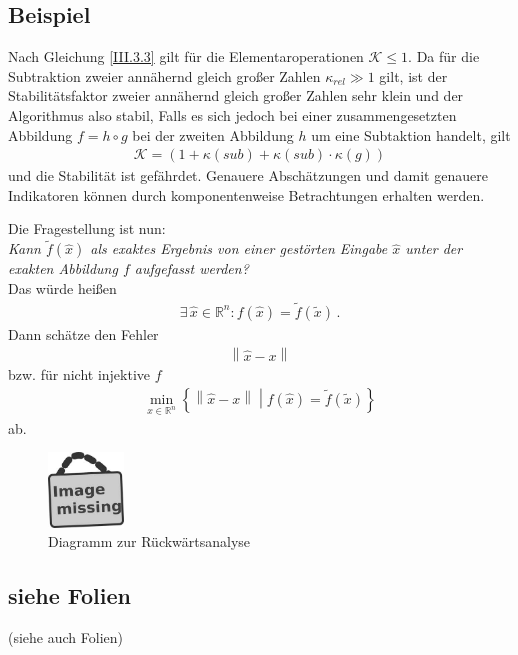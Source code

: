 \documentclass[ngerman,fontsize=11pt, paper=a4, parskip=half, titlepage=true, toc=bib]{scrbook}
\newcommand{\Ren}{\mathds{R}^{n}}
\newcommand{\K}{\mathcal{K}}
\newcommand{\nn}[1]{\left\| #1 \right\|}
\newcommand{\extrasection}[2]{\vspace{1.5eM}\minisec{\Large\itshape \thesection #1 #2}\vspace{1eM}}
\begin{document}
\subsection{Beispiel}
Nach Gleichung \eqref{III.3.3} gilt für die Elementaroperationen $\K\leq 1$.
Da für die Subtraktion zweier annähernd gleich großer Zahlen $\kappa_{rel}\gg 1$ gilt,
ist der Stabilitätsfaktor zweier annähernd gleich großer
Zahlen sehr klein und der Algorithmus also stabil, Falls es sich jedoch bei einer zusammengesetzten Abbildung $f=h\circ g$  bei der zweiten Abbildung $h$ um eine Subtaktion handelt, gilt
\begin{gather*}
	\K =(1+\kappa(sub)+\kappa(sub)\cdot\kappa(g))
\end{gather*}
und die Stabilität ist gefährdet.
Genauere Abschätzungen und damit genauere Indikatoren können durch komponentenweise Betrachtungen erhalten werden.


\extrasection{b)}{Rückwärtsanalyse} 
Die Fragestellung ist nun: \\
\textit{Kann $\widetilde{f}(\widehat{x})$ als exaktes Ergebnis von einer gestörten Eingabe $\widehat{x}$ unter der exakten Abbildung $f$ aufgefasst werden?}\\
Das würde heißen
\begin{gather*}
	\exists\, \widehat{x}\in \Ren: f(\widehat{x})= \widetilde{f}(\widetilde{x}) \, .
\end{gather*}
Dann schätze den Fehler 
\begin{gather*} 
	\nn{\widehat{x}-x}
\end{gather*}
 bzw. für nicht injektive $f$
 \begin{gather*}
	\min_{\widehat{x}\in \Ren}
\left\{
 	\nn{\widehat{x}-x} 
 					\middle\vert f(\widehat{x}) = \widetilde{f}(\widetilde{x}) 
 					\right\}
 \end{gather*} 
  ab. \\
  
  	  \begin{figure}
  	  	\parbox{\linewidth}{
  	  		\centering
  	  		\includegraphics[width=2cm]{images/image_missing.jpg}
  	  	}
  	  	\caption{Diagramm zur Rückwärtsanalyse}
  	  \end{figure}  
  
  \subsection{siehe Folien}
  (siehe auch Folien) \\
  
\end{document}

